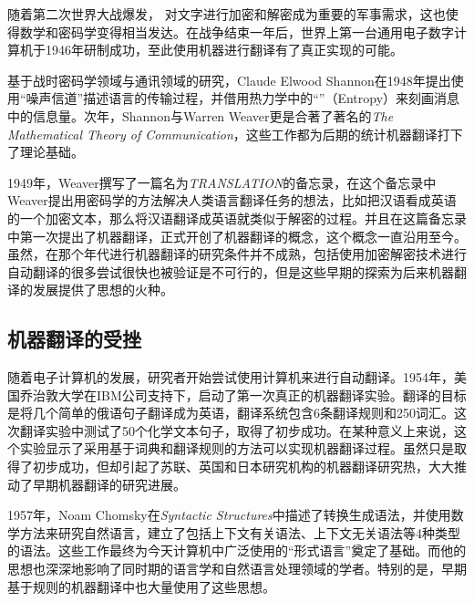 \parinterval 随着第二次世界大战爆发， 对文字进行加密和解密成为重要的军事需求，这也使得数学和密码学变得相当发达。在战争结束一年后，世界上第一台通用电子数字计算机于1946年研制成功，至此使用机器进行翻译有了真正实现的可能。

\parinterval 基于战时密码学领域与通讯领域的研究，Claude Elwood Shannon在1948年提出使用“噪声信道”描述语言的传输过程，并借用热力学中的“{\small{}}”（Entropy）来刻画消息中的信息量。次年，Shannon与Warren Weaver更是合著了著名的\emph{The Mathematical Theory of Communication}，这些工作都为后期的统计机器翻译打下了理论基础。

\parinterval 1949年，Weaver撰写了一篇名为\emph{TRANSLATION}的备忘录，在这个备忘录中Weaver提出用密码学的方法解决人类语言翻译任务的想法，比如把汉语看成英语的一个加密文本，那么将汉语翻译成英语就类似于解密的过程。并且在这篇备忘录中第一次提出了机器翻译，正式开创了机器翻译的概念，这个概念一直沿用至今。虽然，在那个年代进行机器翻译的研究条件并不成熟，包括使用加密解密技术进行自动翻译的很多尝试很快也被验证是不可行的，但是这些早期的探索为后来机器翻译的发展提供了思想的火种。


\subsection{机器翻译的受挫}

\parinterval 随着电子计算机的发展，研究者开始尝试使用计算机来进行自动翻译。1954年，美国乔治敦大学在IBM公司支持下，启动了第一次真正的机器翻译实验。翻译的目标是将几个简单的俄语句子翻译成为英语，翻译系统包含6条翻译规则和250词汇。这次翻译实验中测试了50个化学文本句子，取得了初步成功。在某种意义上来说，这个实验显示了采用基于词典和翻译规则的方法可以实现机器翻译过程。虽然只是取得了初步成功，但却引起了苏联、英国和日本研究机构的机器翻译研究热，大大推动了早期机器翻译的研究进展。

\parinterval 1957年，Noam Chomsky在\emph{Syntactic Structures}中描述了转换生成语法，并使用数学方法来研究自然语言，建立了包括上下文有关语法、上下文无关语法等4种类型的语法。这些工作最终为今天计算机中广泛使用的“形式语言”奠定了基础。而他的思想也深深地影响了同时期的语言学和自然语言处理领域的学者。特别的是，早期基于规则的机器翻译中也大量使用了这些思想。

